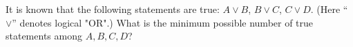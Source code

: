 It is known that the following statements are true: $A \lor B$, $B \lor C$, $C \lor D$. (Here ``\(\lor\)'' denotes logical "OR".) What is the minimum possible number of true statements among $A, B, C, D$?
